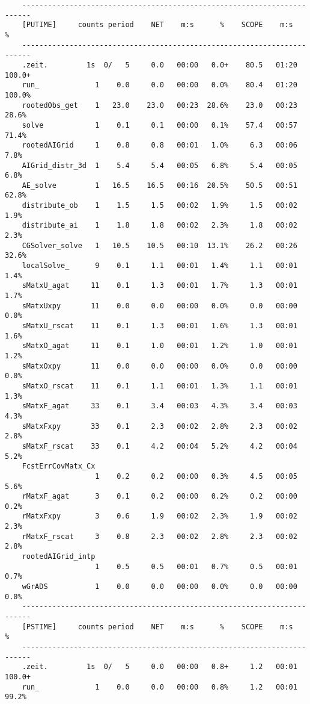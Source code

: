 \begin{verbatim}
    ------------------------------------------------------------------------
    [PUTIME]     counts period    NET    m:s      %    SCOPE    m:s      %
    ------------------------------------------------------------------------
    .zeit.         1s  0/   5     0.0   00:00   0.0+    80.5   01:20 100.0+
    run_             1    0.0     0.0   00:00   0.0%    80.4   01:20 100.0%
    rootedObs_get    1   23.0    23.0   00:23  28.6%    23.0   00:23  28.6%
    solve            1    0.1     0.1   00:00   0.1%    57.4   00:57  71.4%
    rootedAIGrid     1    0.8     0.8   00:01   1.0%     6.3   00:06   7.8%
    AIGrid_distr_3d  1    5.4     5.4   00:05   6.8%     5.4   00:05   6.8%
    AE_solve         1   16.5    16.5   00:16  20.5%    50.5   00:51  62.8%
    distribute_ob    1    1.5     1.5   00:02   1.9%     1.5   00:02   1.9%
    distribute_ai    1    1.8     1.8   00:02   2.3%     1.8   00:02   2.3%
    CGSolver_solve   1   10.5    10.5   00:10  13.1%    26.2   00:26  32.6%
    localSolve_      9    0.1     1.1   00:01   1.4%     1.1   00:01   1.4%
    sMatxU_agat     11    0.1     1.3   00:01   1.7%     1.3   00:01   1.7%
    sMatxUxpy       11    0.0     0.0   00:00   0.0%     0.0   00:00   0.0%
    sMatxU_rscat    11    0.1     1.3   00:01   1.6%     1.3   00:01   1.6%
    sMatxO_agat     11    0.1     1.0   00:01   1.2%     1.0   00:01   1.2%
    sMatxOxpy       11    0.0     0.0   00:00   0.0%     0.0   00:00   0.0%
    sMatxO_rscat    11    0.1     1.1   00:01   1.3%     1.1   00:01   1.3%
    sMatxF_agat     33    0.1     3.4   00:03   4.3%     3.4   00:03   4.3%
    sMatxFxpy       33    0.1     2.3   00:02   2.8%     2.3   00:02   2.8%
    sMatxF_rscat    33    0.1     4.2   00:04   5.2%     4.2   00:04   5.2%
    FcstErrCovMatx_Cx
                     1    0.2     0.2   00:00   0.3%     4.5   00:05   5.6%
    rMatxF_agat      3    0.1     0.2   00:00   0.2%     0.2   00:00   0.2%
    rMatxFxpy        3    0.6     1.9   00:02   2.3%     1.9   00:02   2.3%
    rMatxF_rscat     3    0.8     2.3   00:02   2.8%     2.3   00:02   2.8%
    rootedAIGrid_intp
                     1    0.5     0.5   00:01   0.7%     0.5   00:01   0.7%
    wGrADS           1    0.0     0.0   00:00   0.0%     0.0   00:00   0.0%
    ------------------------------------------------------------------------
    [PSTIME]     counts period    NET    m:s      %    SCOPE    m:s      %
    ------------------------------------------------------------------------
    .zeit.         1s  0/   5     0.0   00:00   0.8+     1.2   00:01 100.0+
    run_             1    0.0     0.0   00:00   0.8%     1.2   00:01  99.2%

\end{verbatim}

